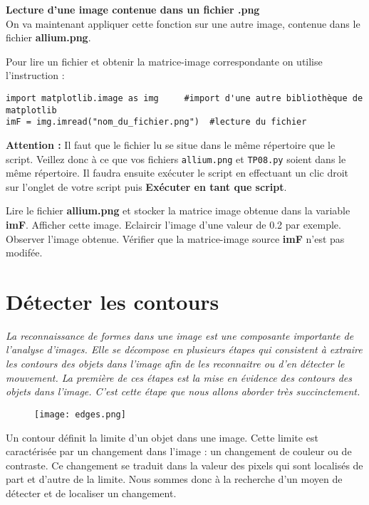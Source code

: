\textbf{Lecture d'une image contenue dans un fichier .png}\\
On va maintenant appliquer cette fonction sur une autre image, contenue dans le fichier \textbf{allium.png}.

Pour lire un fichier et obtenir la matrice-image correspondante on utilise l'instruction :
\begin{lstlisting}
import matplotlib.image as img     #import d'une autre bibliothèque de matplotlib
imF = img.imread("nom_du_fichier.png")  #lecture du fichier
\end{lstlisting}

\textbf{Attention :} Il faut que le fichier lu se situe dans le même répertoire que le script. Veillez donc à ce que vos fichiers \texttt{allium.png} et \texttt{TP08.py} soient dans le même répertoire. Il faudra ensuite exécuter le script en effectuant un clic droit sur l'onglet de votre script puis \textbf{Exécuter en tant que script}.\\

 
\begin{question}
Lire le fichier \textbf{allium.png} et stocker la matrice image obtenue dans la variable \textbf{imF}. Afficher cette image. Eclaircir l'image d'une valeur de 0.2 par exemple. Observer l'image obtenue. Vérifier que la matrice-image source \textbf{imF} n'est pas modifée. 
\end{question}



\section*{Détecter les contours}

\textit{La reconnaissance de formes dans une image est une composante importante de l'analyse d'images.
Elle se décompose en plusieurs étapes qui consistent à extraire les contours des objets dans l'image afin
de les reconnaitre ou d'en détecter le mouvement. La première de ces étapes est la mise en évidence
des contours des objets dans l'image. C'est cette étape que nous allons aborder très succinctement.}
\\

\begin{figure}[!h]
\centering
\texttt{[image: edges.png]}
\end{figure}

Un contour définit la limite d'un objet dans une image. Cette limite est caractérisée par un changement
dans l'image : un changement de couleur ou de contraste. Ce changement se traduit dans la valeur des pixels qui sont localisés de part et d’autre de la limite.
Nous sommes donc à la recherche d’un moyen de détecter et de localiser un changement.\\

